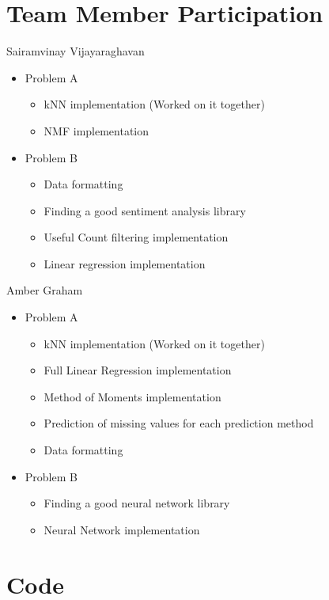 \documentclass{article}
\begin{document}
\section{Team Member Participation}
Sairamvinay Vijayaraghavan
\begin{itemize}
  \item Problem A 
    \begin{itemize}
        \item kNN implementation (Worked on it together)
        \item NMF implementation
    \end{itemize}
  \item Problem B
    \begin{itemize}
        \item Data formatting
        \item Finding a good sentiment analysis library
        \item Useful Count filtering implementation
        \item Linear regression implementation
    \end{itemize}
\end{itemize}
Amber Graham
\begin{itemize}
  \item Problem A 
    \begin{itemize}
        \item kNN implementation (Worked on it together)
        \item Full Linear Regression implementation
        \item Method of Moments implementation
        \item Prediction of missing values for each prediction method
        \item Data formatting
        
    \end{itemize}
  \item Problem B
    \begin{itemize}
        \item Finding a good neural network library
        \item Neural Network implementation
    \end{itemize}
\end{itemize}

\section{Code}
\end{document}
